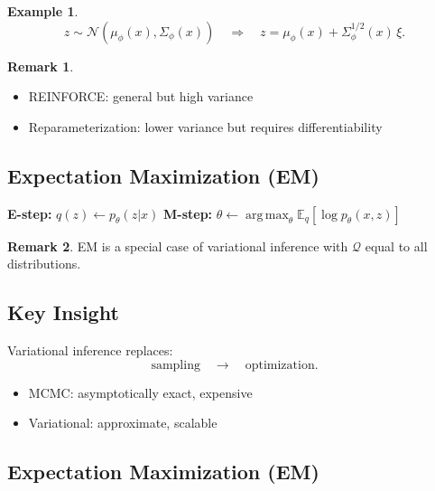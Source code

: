 \documentclass[12pt,oneside]{book}
\numberwithin{equation}{section}
\theoremstyle{definition}
\newtheorem{example}{Example}[section]
\newtheorem{remark}{Remark}[section]
\theoremstyle{plain}
\theoremstyle{remark}
\newcommand{\E}{\mathbb{E}}
\newcommand{\argmax}{\operatorname*{arg\,max}}
\newcommand{\Normal}{\mathcal{N}}
\begin{document}
\begin{example}
\[
z \sim \Normal(\mu_\phi(x), \Sigma_\phi(x))
\quad \Rightarrow \quad
z = \mu_\phi(x) + \Sigma_\phi^{1/2}(x)\,\xi.
\]
\end{example}

\begin{remark}
\begin{itemize}
    \item REINFORCE: general but high variance
    \item Reparameterization: lower variance but requires differentiability
\end{itemize}
\end{remark}

\subsection{Expectation Maximization (EM)}

\begin{algorithm}[H]
\caption{Expectation Maximization}
\begin{algorithmic}[1]
\Repeat
    \State \textbf{E-step:} $q(z) \leftarrow p_\theta(z|x)$
    \State \textbf{M-step:} $\theta \leftarrow \argmax_\theta \E_q[\log p_\theta(x,z)]$
\end{algorithmic}
\end{algorithm}

\begin{remark}
EM is a special case of variational inference with $\mathcal{Q}$ equal to all distributions.
\end{remark}

\subsection{Key Insight}

Variational inference replaces:
\[
\text{sampling} \quad \longrightarrow \quad \text{optimization}.
\]

\begin{itemize}
    \item MCMC: asymptotically exact, expensive
    \item Variational: approximate, scalable
\end{itemize}

\subsection{Expectation Maximization (EM)}
\end{document}
